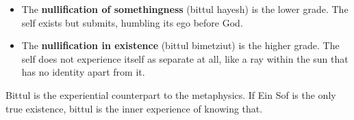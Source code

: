 \begin{itemize}
 \item The \textbf{nullification of somethingness} (bittul hayesh) is the lower
 grade. The self exists but submits, humbling its ego before God.
 \item The \textbf{nullification in existence} (bittul bimetziut) is the higher
 grade. The self does not experience itself as separate at all, like a ray
 within the sun that has no identity apart from it.
\end{itemize}

Bittul is the experiential counterpart to the metaphysics. If Ein Sof is the only
true existence, bittul is the inner experience of knowing that.
